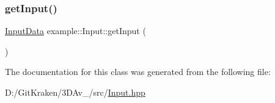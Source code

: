 \mbox{\label{classexample_1_1_input_a9db162ac185cdf3a9f77fb9c49158f51}} 
\subsubsection{\texorpdfstring{get\+Input()}{getInput()}}
{\footnotesize\ttfamily \mbox{\hyperlink{classexample_1_1_input_af6bf4fd763ca01bd106ca3b03f162e3d}{Input\+Data}} example\+::\+Input\+::get\+Input (\begin{DoxyParamCaption}{ }\end{DoxyParamCaption})\hspace{0.3cm}{\ttfamily [inline]}}



The documentation for this class was generated from the following file\+:\begin{DoxyCompactItemize}
\item 
D\+:/\+Git\+Kraken/3\+D\+Av\+\_/src/\mbox{\hyperlink{_input_8hpp}{Input.\+hpp}}\end{DoxyCompactItemize}
